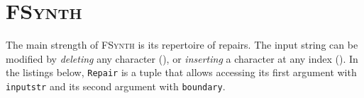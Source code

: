 \documentclass[sigconf,review,anonymous]{acmart}
\makeatletter
\def\<#1>{\texttt{#1}}
\newcommand{\approach}{\textsc{FSynth}\xspace}
\newcommand{\brepair}{\textsc{FSynth}\xspace}
\newcommand\letterboxed[1]{%
\setlength{\fboxsep}{0pt}%
  \@tfor\@ii:=#1\do{%
    \fcolorbox{white}{light-gray}{\texttt{\strut\@ii}}%
  }%
}
\makeatother
\begin{document}
%

\section{\approach}
\label{sec:brepair}
The main strength of \brepair is its repertoire of repairs.
The input string can be modified by \emph{deleting} any character
(), or
\emph{inserting} a character at any index ().
In the listings below, \<Repair> is a tuple that allows
accessing its first argument with \<inputstr> and its second argument with
\<boundary>.
\end{document}
